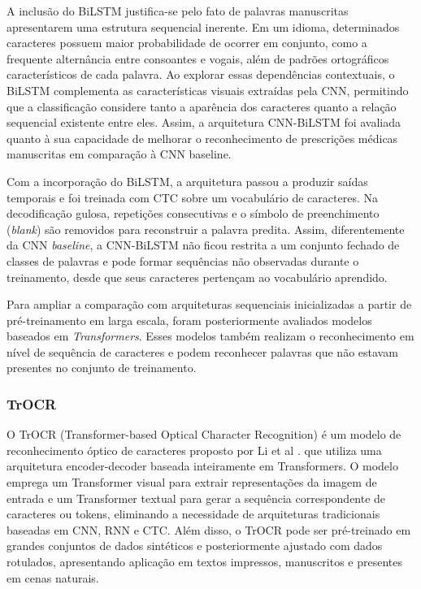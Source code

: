\documentclass[11pt,a4paper]{article}
\begin{document}
A inclusão do BiLSTM justifica-se pelo fato de palavras manuscritas apresentarem uma estrutura sequencial inerente. Em um idioma, determinados caracteres possuem maior probabilidade de ocorrer em conjunto, como a frequente alternância entre consoantes e vogais, além de padrões ortográficos característicos de cada palavra. Ao explorar essas dependências contextuais, o BiLSTM complementa as características visuais extraídas pela CNN, permitindo que a classificação considere tanto a aparência dos caracteres quanto a relação sequencial existente entre eles. Assim, a arquitetura CNN-BiLSTM foi avaliada quanto à sua capacidade de melhorar o reconhecimento de prescrições médicas manuscritas em comparação à CNN baseline.

Com a incorporação do BiLSTM, a arquitetura passou a produzir saídas temporais e foi treinada com CTC sobre um vocabulário de caracteres. Na decodificação gulosa, repetições consecutivas e o símbolo de preenchimento (\textit{blank}) são removidos para reconstruir a palavra predita. Assim, diferentemente da CNN \textit{baseline}, a CNN-BiLSTM não ficou restrita a um conjunto fechado de classes de palavras e pode formar sequências não observadas durante o treinamento, desde que seus caracteres pertençam ao vocabulário aprendido.

Para ampliar a comparação com arquiteturas sequenciais inicializadas a partir de pré-treinamento em larga escala, foram posteriormente avaliados modelos baseados em \textit{Transformers}. Esses modelos também realizam o reconhecimento em nível de sequência de caracteres e podem reconhecer palavras que não estavam presentes no conjunto de treinamento.


\subsubsection{TrOCR}

O TrOCR (Transformer-based Optical Character Recognition) é um modelo de reconhecimento óptico de caracteres proposto por Li et al \cite{li2023trocr}. que utiliza uma arquitetura encoder-decoder baseada inteiramente em Transformers. O modelo emprega um Transformer visual para extrair representações da imagem de entrada e um Transformer textual para gerar a sequência correspondente de caracteres ou tokens, eliminando a necessidade de arquiteturas tradicionais baseadas em CNN, RNN e CTC. Além disso, o TrOCR pode ser pré-treinado em grandes conjuntos de dados sintéticos e posteriormente ajustado com dados rotulados, apresentando aplicação em textos impressos, manuscritos e presentes em cenas naturais.
\end{document}
